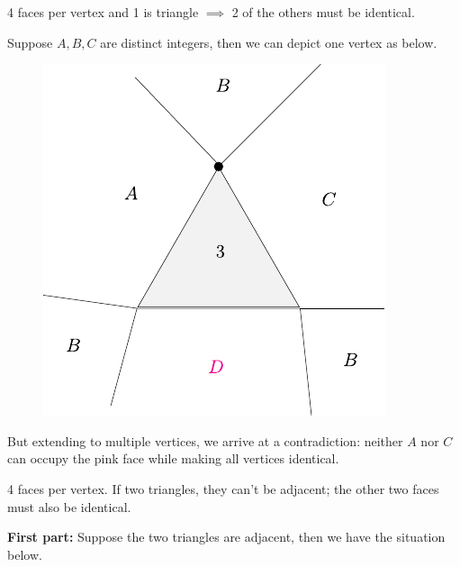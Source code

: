 \documentclass[twoside,10pt]{article}
\begin{document}

\begin{exer}[5.22]
	4 faces per vertex and 1 is triangle $\implies $ 2 of the others must be identical.
\end{exer}

Suppose $A, B, C$ are distinct integers, then we can depict one vertex as below.

\begin{figure}[H]
	\centering
	\includegraphics[scale=1]{fig/22.pdf}
\end{figure}

But extending to multiple vertices, we arrive at a contradiction: neither $A$ nor $C$ can occupy the pink face while making all vertices identical.

\newpage

\begin{exer}[5.23]
4 faces per vertex. If two triangles, they can't be adjacent; the other two faces must also be identical.
\end{exer}

\textbf{First part:} Suppose the two triangles are adjacent, then we have the situation below.
\end{document}
